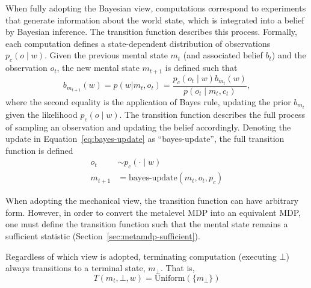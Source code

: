 When fully adopting the Bayesian view, computations correspond to experiments that generate information about the world state, which is integrated into a belief by Bayesian inference. The transition function describes this process. Formally, each computation defines a state-dependent distribution of observations $p_c(o \mid w)$. Given the previous mental state $m_t$ (and associated belief $b_t$) and the observation $o_t$, the new mental state $m_{t+1}$ is defined such that
%
\begin{equation}\label{eq:bayes-update}
  b_{m_{t+1}}(w) = p(w | m_t, o_t) = \frac{
    p_c(o_t \mid w) b_{m_t}(w) 
  }{
    p(o_t \mid m_t, c_t)
  },
\end{equation}
%
where the second equality is the application of Bayes rule, updating the prior $b_{m_t}$ given the likelihood $p_c(o \mid w)$. The transition function describes the full process of sampling an observation and updating the belief accordingly. Denoting the update in Equation~\ref{eq:bayes-update} as ``bayes-update'', the full transition function is defined
%
\begin{align}
  o_t &\sim p_c(\cdot \mid w) \\
  m_{t+1} &= \text{bayes-update}(m_t, o_t, p_c)
\end{align}

When adopting the mechanical view, the transition function can have arbitrary form. However, in order to convert the metalevel MDP into an equivalent MDP, one must define the transition function such that the mental state remains a sufficient statistic (Section~\ref{sec:metamdp-sufficient}).

Regardless of which view is adopted, terminating computation (executing $\bot$) always transitions to a terminal state, $m_\bot$. That is,
%
\begin{equation}
  T(m_t, \bot, w) = \text{Uniform}(\{m_\bot\})
\end{equation}
%




